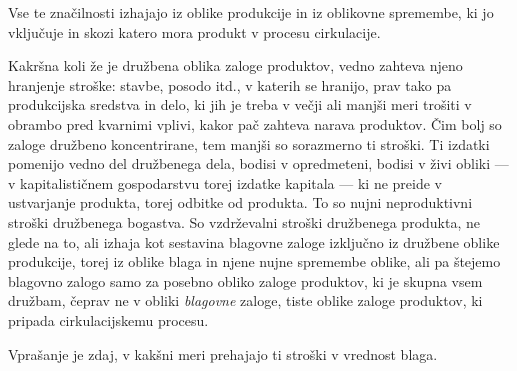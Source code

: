 \documentclass[kapital_02.tex]{subfiles}
\begin{document}
Vse te značilnosti izhajajo iz oblike produkcije in iz oblikovne spremembe, ki jo vključuje in skozi katero mora produkt v procesu cirkulacije.

Kakršna koli že je družbena oblika zaloge produktov, vedno zahteva njeno hranjenje stroške: stavbe, posodo itd., v katerih se hranijo, prav tako pa produkcijska sredstva in delo, ki jih je treba v večji ali manjši meri trošiti v obrambo pred kvarnimi vplivi, kakor pač zahteva narava produktov.
Čim bolj so zaloge družbeno koncentrirane, tem manjši so sorazmerno ti stroški.
Ti izdatki pomenijo vedno del družbenega dela, bodisi v opredmeteni, bodisi v živi obliki — v kapitalističnem gospodarstvu torej izdatke kapitala — ki ne preide v ustvarjanje produkta, torej odbitke od produkta.
To so nujni neproduktivni stroški družbenega bogastva.
So vzdrževalni stroški družbenega produkta, ne glede na to, ali izhaja kot sestavina blagovne zaloge izključno iz družbene oblike produkcije, torej iz oblike blaga in njene nujne spremembe oblike, ali pa štejemo blagovno zalogo samo za posebno obliko zaloge produktov, ki je skupna vsem družbam, čeprav ne v obliki \emph{blagovne} zaloge, tiste oblike zaloge produktov, ki pripada cirkulacijskemu procesu.

Vprašanje je zdaj, v kakšni meri prehajajo ti stroški v vrednost blaga.
\end{document}
